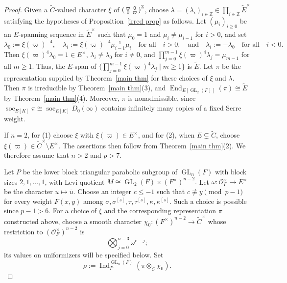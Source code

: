 \documentclass[a4paper,10pt,twoside]{amsart}
\DeclareMathOperator{\Ind}{Ind}
\DeclareMathOperator{\End}{End}
\DeclareMathOperator{\GL}{GL}
\theoremstyle{definition}
\numberwithin{equation}{section}
\begin{document}
\begin{proof}

Given a \(\widetilde C\)-valued character \(\xi\) of
\(
\begin{psmallmatrix}
\varpi&0\\
0&\varpi
\end{psmallmatrix}^{\mathbb{Z}}
\), choose
\(\lambda=(\lambda_i)_{i\in\mathbb Z}\in
\prod_{i\in\mathbb Z}\widetilde E^\times\)
satisfying the hypotheses of Proposition~\ref{irred prop} as follows. Let
\((\mu_i)_{i\geq0}\) be an \(E\)-spanning sequence in
\(\widetilde E^\times\) such that \(\mu_0=1\) and
\(\mu_i\neq\mu_{i-1}\) for \(i>0\), and set
\[
\lambda_0:=\xi(\varpi)^{-4},\quad
\lambda_i:=\xi(\varpi)^{-4}\mu_{i-1}^{-1}\mu_i\quad\text{for all}\quad i>0,
\quad\text{and}\quad
\lambda_i:=-\lambda_0\quad\text{for all}\quad i<0.
\]
Then \(\xi(\varpi)^4\lambda_0=1\in E^\times\),
\(\lambda_i\neq\lambda_0\) for \(i\neq0\), and $\prod_{j=0}^{m-1}\xi(\varpi)^4\lambda_j=\mu_{m-1}$ for all $m\geq1$. Thus, the \(E\)-span of
\(\{\prod_{j=0}^{m-1}\xi(\varpi)^4\lambda_j\mid m\geq1\}\)
is \(\widetilde E\). Let \(\pi\) be the representation supplied by
Theorem~\ref{main thm} for these choices of \(\xi\) and \(\lambda\). Then
\(\pi\) is irreducible by Theorem~\ref{main thm}\textup{(3)}, and
\(
\End_{E[\GL_2(F)]}(\pi)\cong\widetilde E
\)
by Theorem~\ref{main thm}\textup{(4)}. Moreover, \(\pi\) is nonadmissible, since
\(\operatorname{soc}_{E[K]}\pi\cong
\operatorname{soc}_{E[K]}\widetilde D_0(\infty)\) contains infinitely
many copies of a fixed Serre weight.

If \(n=2\), for \textup{(1)} choose \(\xi\) with
\(\xi(\varpi)\in E^\times\), and for \textup{(2)}, when
\(E\subsetneq\widetilde C\), choose
\(\xi(\varpi)\in\widetilde C^\times\setminus E^\times\).
The assertions then follow from Theorem~\ref{main thm}\textup{(2)}. We therefore assume
that \(n>2\) and $p>7$.

Let \(P\) be the lower block triangular parabolic subgroup of
\(\GL_n(F)\) with block sizes \(2,1,\ldots,1\), with Levi quotient
\(
M\cong\GL_2(F)\times(F^\times)^{n-2}.
\)
Let \(\omega:\mathcal O_F^\times\to E^\times\) be the character
\(u\mapsto\overline u\). Choose an integer \(c\leq-1\) such that
\(c\not\equiv y\pmod{p-1}\) for every weight \(F(x,y)\) among
\(\sigma,\sigma^{[s]},\tau,\tau^{[s]},\kappa,\kappa^{[s]}\).
Such a choice is possible since \(p-1>6\). For a choice of \(\xi\) and the corresponding representation
\(\pi\) constructed above, choose a smooth character
\(\chi_0:(F^\times)^{n-2}\to\widetilde C^\times\) whose restriction
to \((\mathcal O_F^\times)^{n-2}\) is
\[
\bigotimes_{j=0}^{n-3}\omega^{c-j};
\]
its values on uniformizers will be specified below. Set
\[
\rho:=\Ind_P^{\GL_n(F)}
(\pi\otimes_{\widetilde C}\chi_0).
\]


\end{proof}
\end{document}

